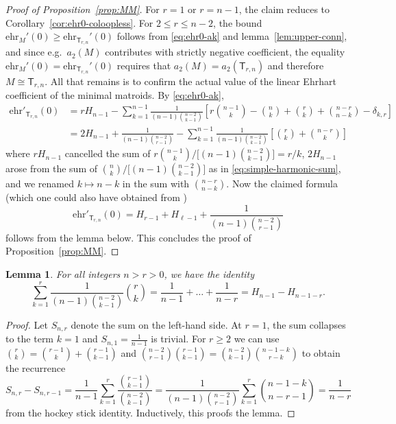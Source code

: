 \documentclass[pagesize,paper=A4,11pt,bibliography=totoc,oneside]{scrartcl}
\newtheorem{lemma}[thm]{Lemma}
\newcommand{\MM}[2]{\mathsf{T}_{#2,#1}} %
\newcommand{\ehr}{\mathrm{ehr}}
\newcommand{\HN}{H} %
\begin{document}
\begin{proof}[{Proof of Proposition~\ref{prop:MM}}]
    For $r=1$ or $r=n-1$, the claim reduces to Corollary~\ref{cor:ehr0-coloopless}. For $2\leq r\leq n-2$, the bound $\ehr_M'(0)\geq\ehr_{\MM{n}{r}}'(0)$ follows from \eqref{eq:ehr0-ak} and lemma~\ref{lem:upper-conn}, and since e.g.\ $a_2(M)$ contributes with strictly negative coefficient, the equality $\ehr_M'(0)=\ehr_{\MM{n}{r}}'(0)$ requires that $a_2(M)=a_2(\MM{n}{r})$ and therefore $M\cong\MM{n}{r}$. All that remains is to confirm the actual value of the linear Ehrhart coefficient of the minimal matroids. By \eqref{eq:ehr0-ak},
    \begin{align*}
        \ehr'_{\MM{n}{r}}(0) 
        &= r\HN_{n-1} - \sum_{k=1}^{n-1} \frac{1}{(n-1)\binom{n-2}{k-1}} \left[ r\binom{n-1}{k}-\binom{n}{k}+\binom{r}{k}+\binom{n-r}{n-k}-\delta_{k,r} \right] \\
        &=2\HN_{n-1}+\frac{1}{(n-1)\binom{n-2}{r-1}} -\sum_{k=1}^{n-1} \frac{1}{(n-1)\binom{n-2}{k-1}} \left[ \binom{r}{k}+\binom{n-r}{k} \right] 
    \end{align*}
    where $r\HN_{n-1}$ cancelled the sum of $r\binom{n-1}{k}/\big[(n-1)\binom{n-2}{k-1}\big]=r/k$, $2\HN_{n-1}$ arose from the sum of $\binom{n}{k}/\big[(n-1)\binom{n-2}{k-1}\big]$ as in \eqref{eq:simple-harmonic-sum}, and we renamed $k\mapsto n-k$ in the sum with $\binom{n-r}{n-k}$. Now the claimed formula (which one could also have obtained from \cite[Theorem~1.6]{Ferroni:EhrhartMinimal})
    \begin{equation*}
        \ehr'_{\MM{n}{r}}(0)=\HN_{r-1}+\HN_{\ell-1}+\frac{1}{(n-1)\binom{n-2}{r-1}}
    \end{equation*}
    follows from the lemma below. This concludes the proof of Proposition~\ref{prop:MM}.
\end{proof}
\begin{lemma}
    For all integers $n>r>0$, we have the identity
    \begin{equation*}
        \sum_{k=1}^r \frac{1}{(n-1)\binom{n-2}{k-1}}\binom{r}{k} = \frac{1}{n-1}+\ldots+\frac{1}{n-r}=\HN_{n-1}-\HN_{n-1-r}.
    \end{equation*}
\end{lemma}
\begin{proof}
    Let $S_{n,r}$ denote the sum on the left-hand side. At $r=1$, the sum collapses to the term $k=1$ and $S_{n,1}=\frac{1}{n-1}$ is trivial. For $r\geq 2$ we can use $\binom{r}{k}=\binom{r-1}{k}+\binom{r-1}{k-1}$ and $\binom{n-2}{r-1}\binom{r-1}{k-1}=\binom{n-2}{k-1}\binom{n-1-k}{r-k}$ to obtain the recurrence
    \begin{equation*}
        S_{n,r}-S_{n,r-1}
        = \frac{1}{n-1}\sum_{k=1}^{r} \frac{\binom{r-1}{k-1}}{\binom{n-2}{k-1}}
        = \frac{1}{(n-1)\binom{n-2}{r-1}}\sum_{k=1}^{r} \binom{n-1-k}{n-r-1}
        =\frac{1}{n-r}
    \end{equation*}
    from the hockey stick identity. Inductively, this proofs the lemma.
\end{proof}



\end{document}

